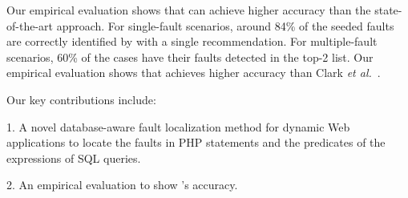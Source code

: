 %
Our empirical evaluation shows that {\tool} can achieve higher
accuracy than the state-of-the-art approach. For single-fault
scenarios, around 84\% of the seeded faults are correctly identified
by {\tool} with a single recommendation. For multiple-fault scenarios,
60\% of the cases have their faults detected in the top-2 list.  Our
empirical evaluation shows that {\tool} achieves higher accuracy than
Clark {\em et al.}~\cite{ga-ase11}.


Our key contributions include:

1. A novel database-aware fault localization method for dynamic
Web applications to locate the faults in PHP statements and the
predicates of the  expressions of SQL queries.


2. An empirical evaluation to show {\tool}'s accuracy.




